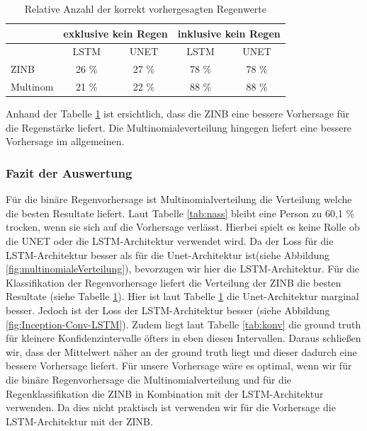\begin{table}[h]
\centering
\begin{tabular}[h]{|l|c|c|c|c|}
\hline
&\multicolumn{2}{c}{exklusive kein Regen} &
\multicolumn{2}{c|}{inklusive kein Regen} \\
\hline
& LSTM & UNET & LSTM & UNET \\
\hline
ZINB & 26 \% & 27 \% & 78 \% & 78 \% \\
Multinom & 21 \% & 22 \% & 88 \% & 88 \% \\
\hline
\end{tabular}
\caption{Relative Anzahl der korrekt vorhergesagten Regenwerte\label{tab:raintable}}
\end{table}

\noindent Anhand der Tabelle \ref{tab:raintable} ist ersichtlich, dass die ZINB eine bessere Vorhersage für die Regenstärke liefert. Die Multinomialeverteilung hingegen liefert eine bessere Vorhersage im allgemeinen.

\subsubsection{Fazit der Auswertung}

Für die binäre Regenvorhersage ist Multinomialverteilung die Verteilung welche die besten Resultate liefert. Laut Tabelle \ref{tab:nass} bleibt eine Person zu 60,1 \% trocken, wenn sie sich auf die Vorhersage verlässt. Hierbei spielt es keine Rolle ob die UNET oder die LSTM-Architektur verwendet wird. Da der Loss für die LSTM-Architektur besser als für die Unet-Architektur ist(siehe Abbildung \ref{fig:multinomialeVerteilung}), bevorzugen wir hier die LSTM-Architektur. Für die Klassifikation der Regenvorhersage liefert die Verteilung der ZINB die besten Resultate (siehe Tabelle \ref{tab:raintable}). Hier ist laut Tabelle \ref{tab:raintable} die Unet-Architektur marginal besser. Jedoch ist der Loss der LSTM-Architektur besser (siehe Abbildung \ref{fig:Inception-Conv-LSTM}). Zudem liegt laut Tabelle \ref{tab:konv} die ground truth für kleinere Konfidenzintervalle öfters in eben diesen Intervallen. Daraus schließen wir, dass der Mittelwert näher an der ground truth liegt und dieser dadurch eine bessere Vorhersage liefert. Für unsere Vorhersage wäre es optimal, wenn wir für die binäre Regenvorhersage die Multinomialverteilung und für die Regenklassifikation die ZINB in Kombination mit der LSTM-Architektur verwenden. Da dies nicht praktisch ist verwenden wir für die Vorhersage die LSTM-Architektur mit der ZINB.


